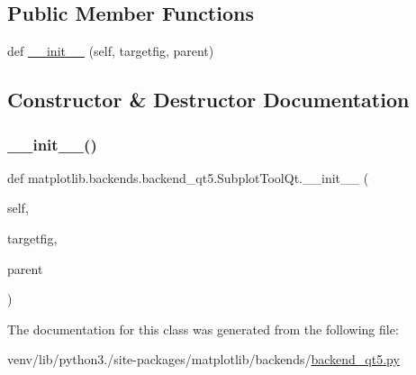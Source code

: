 \subsection*{Public Member Functions}
\begin{DoxyCompactItemize}
\item 
def \hyperlink{classmatplotlib_1_1backends_1_1backend__qt5_1_1SubplotToolQt_a0f585f047a8a6ba2f990a7fd978b6c40}{\+\_\+\+\_\+init\+\_\+\+\_\+} (self, targetfig, parent)
\end{DoxyCompactItemize}


\subsection{Constructor \& Destructor Documentation}
\mbox{\label{classmatplotlib_1_1backends_1_1backend__qt5_1_1SubplotToolQt_a0f585f047a8a6ba2f990a7fd978b6c40}} 
\subsubsection{\texorpdfstring{\+\_\+\+\_\+init\+\_\+\+\_\+()}{\_\_init\_\_()}}
{\footnotesize\ttfamily def matplotlib.\+backends.\+backend\+\_\+qt5.\+Subplot\+Tool\+Qt.\+\_\+\+\_\+init\+\_\+\+\_\+ (\begin{DoxyParamCaption}\item[{}]{self,  }\item[{}]{targetfig,  }\item[{}]{parent }\end{DoxyParamCaption})}



The documentation for this class was generated from the following file\+:\begin{DoxyCompactItemize}
\item 
venv/lib/python3./site-\/packages/matplotlib/backends/\hyperlink{backend__qt5_8py}{backend\+\_\+qt5.\+py}\end{DoxyCompactItemize}

